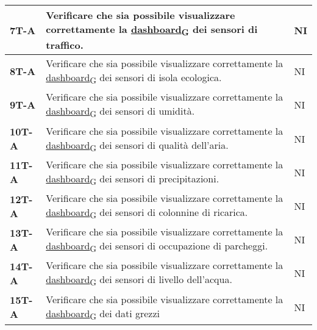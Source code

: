 \begin{longtable}{|>{\raggedright\arraybackslash}m{}|>{\raggedright\arraybackslash}m{}|>{\raggedright\arraybackslash}m{}|}
	\hline
	\textbf{7T-A}   & Verificare che sia possibile visualizzare correttamente la \href{https://7last.github.io/docs/rtb/documentazione-interna/glossario\#dashboard}{dashboard\textsubscript{G}} dei sensori di traffico.                          & NI             \\
	\hline
	\textbf{8T-A}   & Verificare che sia possibile visualizzare correttamente la \href{https://7last.github.io/docs/rtb/documentazione-interna/glossario\#dashboard}{dashboard\textsubscript{G}} dei sensori di isola ecologica.                   & NI             \\
	\hline
	\textbf{9T-A}   & Verificare che sia possibile visualizzare correttamente la \href{https://7last.github.io/docs/rtb/documentazione-interna/glossario\#dashboard}{dashboard\textsubscript{G}} dei sensori di umidità.                           & NI             \\
	\hline
	\textbf{10T-A}  & Verificare che sia possibile visualizzare correttamente la \href{https://7last.github.io/docs/rtb/documentazione-interna/glossario\#dashboard}{dashboard\textsubscript{G}} dei sensori di qualità dell'aria.                 & NI             \\
	\hline
	\textbf{11T-A}  & Verificare che sia possibile visualizzare correttamente la \href{https://7last.github.io/docs/rtb/documentazione-interna/glossario\#dashboard}{dashboard\textsubscript{G}} dei sensori di precipitazioni.                    & NI             \\
	\hline
	\textbf{12T-A}  & Verificare che sia possibile visualizzare correttamente la \href{https://7last.github.io/docs/rtb/documentazione-interna/glossario\#dashboard}{dashboard\textsubscript{G}} dei sensori di colonnine di ricarica.             & NI             \\
	\hline
	\textbf{13T-A}  & Verificare che sia possibile visualizzare correttamente la \href{https://7last.github.io/docs/rtb/documentazione-interna/glossario\#dashboard}{dashboard\textsubscript{G}} dei sensori di occupazione di parcheggi.          & NI             \\
	\hline
	\textbf{14T-A}  & Verificare che sia possibile visualizzare correttamente la \href{https://7last.github.io/docs/rtb/documentazione-interna/glossario\#dashboard}{dashboard\textsubscript{G}} dei sensori di livello dell'acqua.                & NI             \\
	\hline
	\textbf{15T-A}  & Verificare che sia possibile visualizzare correttamente la \href{https://7last.github.io/docs/rtb/documentazione-interna/glossario\#dashboard}{dashboard\textsubscript{G}} dei dati grezzi                                   & NI             \\

\end{longtable}
